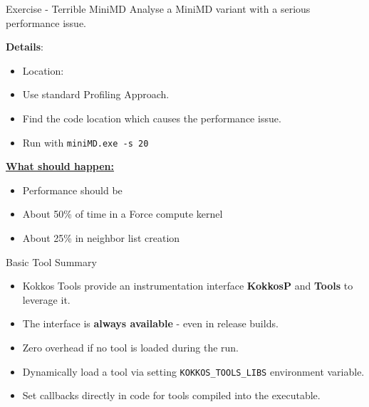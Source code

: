 \begin{frame}[fragile]{Exercise - Terrible MiniMD}
Analyse a MiniMD variant with a serious performance issue.

  \vspace{10pt}

\textbf{Details}:
\begin{small}
\begin{itemize}
  \item Location: 
  \item Use standard Profiling Approach.
  \item Find the code location which causes the performance issue.
  \item Run with \texttt{miniMD.exe -s 20}
\end{itemize}
\end{small}

\ul{\textbf{What should happen:}}
  \begin{small}
  \begin{itemize}
  \item Performance should be
  \item About 50\% of time in a Force compute kernel
  \item About 25\% in neighbor list creation
  \end{itemize}
  \end{small}
\end{frame}


\begin{frame}[fragile]{Basic Tool Summary}
\begin{itemize}
  \item Kokkos Tools provide an instrumentation interface \textbf{KokkosP} and \textbf{Tools} to leverage it.
  \item The interface is \textbf{always available} - even in release builds.
  \item Zero overhead if no tool is loaded during the run.
  \item Dynamically load a tool via setting \texttt{KOKKOS\_TOOLS\_LIBS} environment variable.
  \item Set callbacks directly in code for tools compiled into the executable. 
\end{itemize}
\end{frame}

